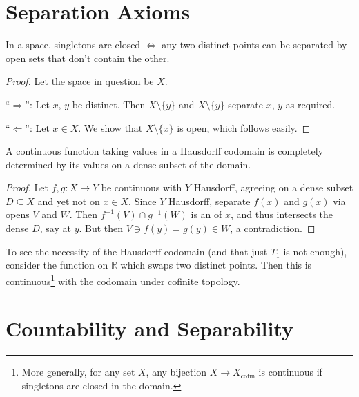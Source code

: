 	
	
	

\section{Separation Axioms}

	\begin{lem}[$T_1$ spaces]\label{LEM: t1 spaces}
		In a space, singletons are closed $\iff$ any two distinct points can be separated by open sets that don't contain the other.
	\end{lem}
	
	\begin{proof}
		Let the space in question be $X$.
		
		``$\Rightarrow$'': Let $x$, $y$ be distinct. Then $X\setminus\{y\}$ and $X\setminus\{y\}$ separate $x$, $y$ as required.
		
		``$\Leftarrow$'': Let $x\in X$. We show that $X\setminus\{x\}$ is open, which follows easily.
	\end{proof}
	

	\begin{prp}\label{PRP: cont func into Hausdorff uniquely by its vals on dense subset}
		A continuous function taking values in a Hausdorff codomain is completely determined by its values on a dense subset of the domain.
	\end{prp}
	
	\begin{proof}
		Let $f, g\colon X\to Y$ be continuous with $Y$ Hausdorff, agreeing on a dense subset $D\subseteq X$ and yet not on $x\in X$. Since \uline{$Y$ Hausdorff}, separate $f(x)$ and $g(x)$ via opens $V$ and $W$. Then $f^{-1}(V)\cap g^{-1}(W)$ is an \onbd of $x$, and thus intersects the \uline{dense $D$}, say at $y$. But then $V\ni f(y) = g(y)\in W$, a contradiction.
	\end{proof}
	
	\begin{rmk}
		To see the necessity of the Hausdorff codomain (and that just $T_1$ is not enough), consider the function on $\mathbb R$ which swaps two distinct points. Then this is continuous\footnote{
			More generally, for any set $X$, any bijection $X\to X_\text{cofin}$ is continuous if singletons are closed in the domain.
		} with the codomain under cofinite topology.
	\end{rmk}

	



\section{Countability and Separability}

